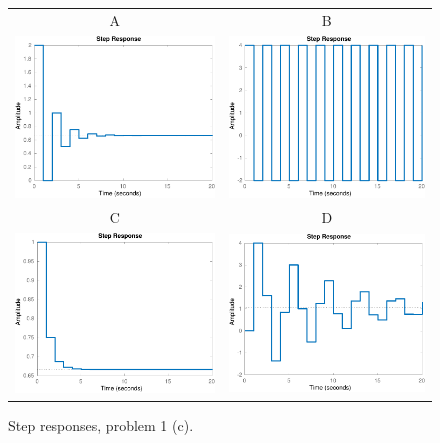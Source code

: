 \documentclass[letter,12pt]{article}
\begin{document}
\begin{figure}[tp]
\begin{center}
\begin{tabular}{cc}
A & B\\
\includegraphics[width=0.4\linewidth]{step-plot-1-crop}
&\includegraphics[width=0.4\linewidth]{step-plot-2-crop}\\
C & D\\
\includegraphics[width=0.4\linewidth]{step-plot-3-crop}
&\includegraphics[width=0.4\linewidth]{step-plot-4-crop}

\end{tabular}
\caption{Step responses, problem 1 (c).}
\label{fig:step}
\end{center}
\end{figure}
\end{document}
